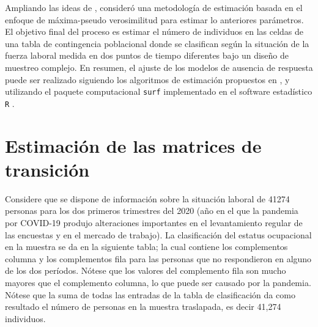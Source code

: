 \documentclass[
  12pt,
]{book}
\begin{document}
Ampliando las ideas de \citet{Feinberg_Stasny_1983}, \citet{Gutierrez_2014} consideró una metodología de estimación basada en el enfoque de máxima-pseudo verosimilitud para estimar lo anteriores parámetros. El objetivo final del proceso es estimar el número de individuos en las celdas de una tabla de contingencia poblacional donde se clasifican según la situación de la fuerza laboral medida en dos puntos de tiempo diferentes bajo un diseño de muestreo complejo. En resumen, el ajuste de los modelos de ausencia de respuesta puede ser realizado siguiendo los algoritmos de estimación propuestos en \citet{Gutierrez_2014}, y utilizando el paquete computacional \texttt{surf} implementado en el software estadístico \texttt{R} \citep{Jacob_2020}.

\hypertarget{estimaciuxf3n-de-las-matrices-de-transiciuxf3n}{%
\section{Estimación de las matrices de transición}\label{estimaciuxf3n-de-las-matrices-de-transiciuxf3n}}

Considere que se dispone de información sobre la situación laboral de 41274 personas para los dos primeros trimestres del 2020 (año en el que la pandemia por COVID-19 produjo alteraciones importantes en el levantamiento regular de las encuestas y en el mercado de trabajo). La clasificación del estatus ocupacional en la muestra se da en la siguiente tabla; la cual contiene los complementos columna y los complementos fila para las personas que no respondieron en alguno de los dos períodos. Nótese que los valores del complemento fila son mucho mayores que el complemento columna, lo que puede ser causado por la pandemia. Nótese que la suma de todas las entradas de la tabla de clasificación da como resultado el número de personas en la muestra traslapada, es decir 41,274 individuos.
\end{document}
